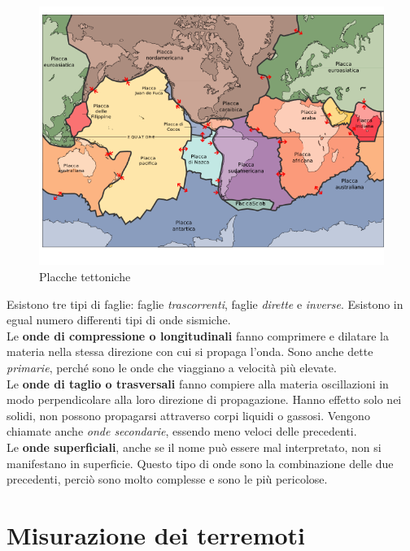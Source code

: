 \documentclass[a4paper,10pt]{memoir}
\begin{document}
\begin{figure}
\caption{Placche tettoniche}
\label{fig:placchetettoniche}
\includegraphics[width=1\textwidth]{Chapter-1/placche-tettoniche.png}
\end{figure}

Esistono tre tipi di faglie: faglie \textit{trascorrenti}, faglie \textit{dirette} e \textit{inverse}.
Esistono in egual numero differenti tipi di onde sismiche.
\\
Le \textbf{onde di compressione o longitudinali} fanno comprimere e dilatare la materia nella stessa direzione con cui si propaga l'onda.
Sono anche dette \textit{primarie}, perché sono le onde che viaggiano a velocità più elevate.
\\
Le \textbf{onde di taglio o trasversali} fanno compiere alla materia oscillazioni in modo perpendicolare alla loro direzione di propagazione. Hanno effetto solo nei solidi, non possono propagarsi attraverso corpi liquidi o gassosi.
Vengono chiamate anche \textit{onde secondarie}, essendo meno veloci delle precedenti.
\\
Le \textbf{onde superficiali}, anche se il nome può essere mal interpretato, non si manifestano in superficie. Questo tipo di onde sono la combinazione delle due precedenti, perciò sono molto complesse e sono le più pericolose. 

\clearpage

\section{Misurazione dei terremoti}
\end{document}
